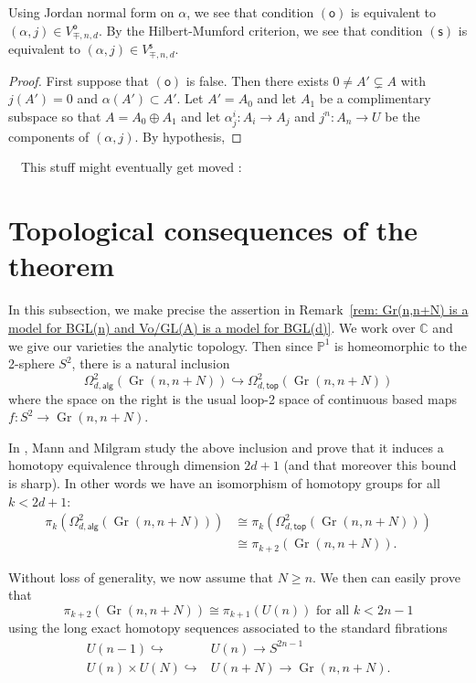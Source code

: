 \documentclass{amsart}
\theoremstyle{definition}
\newcommand{\CC} {{\mathbb C}}          %
\newcommand{\PP}{\mathbb{P}}
\newcommand{\alg}{\mathsf{alg}}
\newcommand{\open}{\mathsf{o}}
\newcommand{\stable}{\mathsf{s}}
\renewcommand{\top}{\mathsf{top}}
\newcommand{\Gr}{\operatorname{Gr}}
\newcommand{\LoopTwo}{\Omega^{2}_{d,\alg}}
\newcommand{\LoopTwoTop}{\Omega^{2}_{d,\top}}
\begin{document}
Using Jordan normal form on $\alpha$, we see that condition $(\open )$
is equivalent to $(\alpha ,j)\in V^{\open}_{\mp ,n,d}$. By the
Hilbert-Mumford criterion, we see that condition $(\stable )$ is
equivalent to $(\alpha ,j)\in V^{\stable}_{\mp ,n,d}$.

\begin{proof}
First suppose that $(\open )$ is false. Then there exists $0\neq A'
\subsetneq A $ with $j(A')=0$ and $\alpha (A')\subset A'$. Let
$A'=A_{0}$ and let $A_{1}$ 
be a complimentary subspace so that $A=A_{0}\oplus A_{1}$ and let
$\alpha^{i}_{j}:A_{i}\to A_{j} $ and $j^{n}:A_{n}\to U$ be the
components of $(\alpha ,j)$. By hypothesis, 
\end{proof}




\vfill




\pagebreak

~~This stuff might eventually get moved :

\section{Topological consequences of the theorem}\label{sec:
topological consequences}

In this subsection, we make precise the assertion in Remark~\ref{rem:
Gr(n,n+N) is a model for BGL(n) and Vo/GL(A) is a model for
BGL(d)}. We work over $\CC$ and we give our varieties the analytic
topology. Then since $\PP^{1}$ is homeomorphic to the 2-sphere
$S^{2}$, there is a natural inclusion
\[
\LoopTwo (\Gr (n,n+N))\hookrightarrow \LoopTwoTop  (\Gr (n,n+N))
\]
where the space on the right is the usual loop-2 space of continuous
based maps $f:S^{2}\to \Gr (n,n+N)$.

In \cite{Mann-Milgram-93}, Mann and Milgram study the above inclusion
and prove that it induces a homotopy equivalence through dimension
$2d+1$ (and that moreover this bound is sharp). In other words we have
an isomorphism of homotopy groups for all $k<2d+1$:
\begin{align*}
\pi_{k}(\LoopTwo (\Gr (n,n+N))) &\cong \pi_{k}(\LoopTwoTop (\Gr (n,n+N)))\\
&\cong \pi_{k+2}(\Gr (n,n+N)).
\end{align*}

Without loss of generality, we now assume that $N\geq n$. We then can
easily prove that 
\[
\pi_{k+2}(\Gr (n,n+N))\cong \pi_{k+1}(U(n)) \text{ for all $k<2n-1$}
\]
using the long exact homotopy sequences associated to the standard
fibrations 
\begin{align*}
U(n-1)\hookrightarrow &U(n) \to S^{2n-1}\\
U(n)\times U(N) \hookrightarrow & U(n+N)  \to \Gr (n,n+N).
\end{align*}
\end{document}
